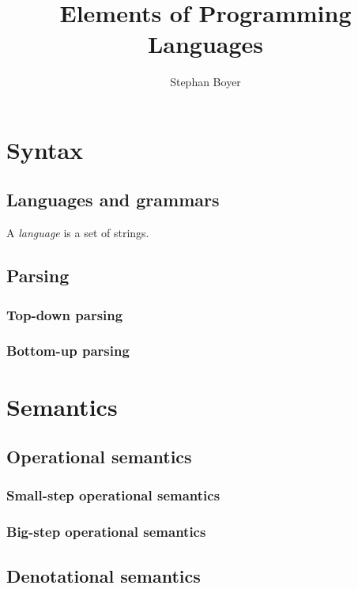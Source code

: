 \documentclass[oneside]{book}
\title{Elements of Programming Languages}
\author{Stephan Boyer}
\date{}
\begin{document}
  

  \frontmatter

  

  

  \tableofcontents

  \mainmatter

  \part{Syntax}

    \chapter{Languages and grammars}

      A \emph{language} is a set of strings.

    \chapter{Parsing}

      \section{Top-down parsing}

      \section{Bottom-up parsing}

  \part{Semantics}

    \chapter{Operational semantics}

      \section{Small-step operational semantics}

      \section{Big-step operational semantics}

    \chapter{Denotational semantics}
\end{document}
